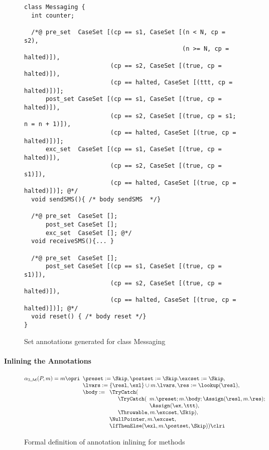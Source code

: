 \begin{figure}[t]
\begin{verbatim}
class Messaging {
  int counter;

  /*@ pre_set  CaseSet [(cp == s1, CaseSet [(n < N, cp = s2),
                                            (n >= N, cp = halted)]),
                        (cp == s2, CaseSet [(true, cp = halted)]),
                        (cp == halted, CaseSet [(ttt, cp = halted)])];
      post_set CaseSet [(cp == s1, CaseSet [(true, cp = halted)]),
                        (cp == s2, CaseSet [(true, cp = s1; n = n + 1)]),
                        (cp == halted, CaseSet [(true, cp = halted)])];
      exc_set  CaseSet [(cp == s1, CaseSet [(true, cp = halted)]),
                        (cp == s2, CaseSet [(true, cp = s1)]),
                        (cp == halted, CaseSet [(true, cp = halted)])]; @*/
  void sendSMS(){ /* body sendSMS  */}

  /*@ pre_set  CaseSet [];
      post_set CaseSet [];
      exc_set  CaseSet []; @*/
  void receiveSMS(){... }

  /*@ pre_set  CaseSet [];
      post_set CaseSet [(cp == s1, CaseSet [(true, cp = s1)]),
                        (cp == s2, CaseSet [(true, cp = halted)]),
                        (cp == halted, CaseSet [(true, cp = halted)])]; @*/
  void reset() { /* body reset */}
}
\end{verbatim}
\caption{Set annotations generated for class Messaging}\label{FigExampleImplem}
\end{figure}



\paragraph{Inlining the Annotations}

\begin{figure}[t]
\[
\alpha_{3, \mathcal{M}}(P, m) = m \opri
\begin{array}[t]{l}
\preset := \Skip, \postset := \Skip. \excset := \Skip,\\
\lvars := \{\resl, \exl\} \cup m.\lvars,
\res := \lookup(\resl), \\
\body :=
\begin{array}[t]{l}
\TryCatch(\\
\quad \begin{array}[t]{l}
  \TryCatch(
  \begin{array}[t]{l}
   m.\preset; m.\body; \Assign(\resl, m.\res); \\
   \Assign(\ex, \ttt),
  \end{array}\\
  \Throwable, m.\excset, \Skip),
\end{array}\\
\NullPointer, m.\excset,\\
\IfThenElse(\exl, m.\postset, \Skip)) \clri
\end{array}
\end{array}
\]
\caption{Formal definition of annotation inlining for methods}
\end{figure}

